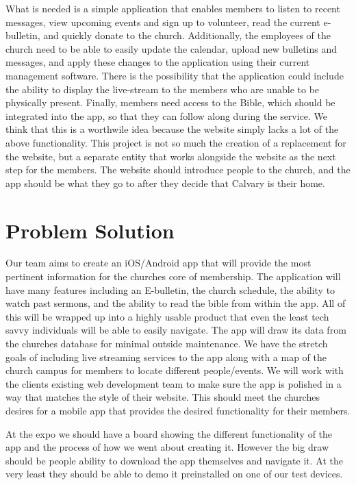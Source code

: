 \documentclass[letterpaper,10pt,draftclsnofoot,onecolumn,titlepage]{IEEEtran}
\begin{document}
	What is needed is a simple application that enables members to listen to recent messages, view upcoming events and sign up to volunteer, read the current e-bulletin, and quickly donate to the church.
	Additionally, the employees of the church need to be able to easily update the calendar, upload new bulletins and messages, and apply these changes to the application using their current management software.
	There is the possibility that the application could include the ability to display the live-stream to the members who are unable to be physically present.
	Finally, members need access to the Bible, which should be integrated into the app, so that they can follow along during the service.
	We think that this is a worthwile idea because the website simply lacks a lot of the above functionality.
	This project is not so much the creation of a replacement for the website, but a separate entity that works alongside the website as the next step for the members.
	The website should introduce people to the church, and the app should be what they go to after they decide that Calvary is their home.

	\section*{Problem Solution}
	Our team aims to create an iOS/Android app that will provide the most pertinent information for the churches core of membership.
	The application will have many features including an E-bulletin, the church schedule, the ability to watch past sermons, and the ability to read the bible from within the app.
	All of this will be wrapped up into a highly usable product that even the least tech savvy individuals will be able to easily navigate.
	The app will draw its data from the churches database for minimal outside maintenance.
	We have the stretch goals of including live streaming services to the app along with a map of the church campus for members to locate different people/events.
	We will work with the clients existing web development team to make sure the app is polished in a way that matches the style of their website.
	This should meet the churches desires for a mobile app that provides the desired functionality for their members.

	At the expo we should have a board showing the different functionality of the app and the process of how we went about creating it.
	However the big draw should be people ability to download the app themselves and navigate it.
	At the very least they should be able to demo it preinstalled on one of our test devices.
\end{document}
